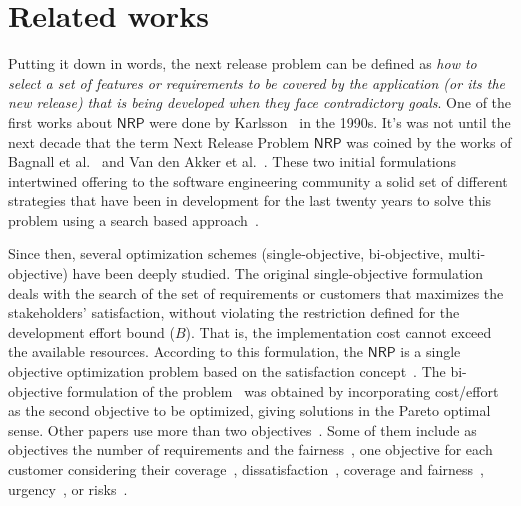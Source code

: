 \section{Related works}
\label{sec:related-work}

Putting it down in words, the next release problem can be defined as \emph{how to select a set of features or requirements to be covered by the application (or its the new release) that is being developed when they face contradictory goals}. One of the first works about \ensuremath{\mathsf{NRP}} were done by Karlsson~\cite{karlsson1996} in the 1990s. It's was not until the next decade that the term Next Release Problem \ensuremath{\mathsf{NRP}} was coined by the works of Bagnall et al.~\cite{bagnall2001} and Van den Akker et al.~\cite{van2005}. These two initial formulations intertwined offering to the software engineering community a solid set of different strategies that have been in development for the last twenty years to solve this problem  using a search based approach~\cite{pitangueira2015,hujainah2018}.

Since then,  several optimization schemes (single-objective, bi-objective, multi-objective) have been deeply studied. The original single-objective formulation~\cite{bagnall2001,van2005} deals with the search of the set of requirements or customers that maximizes the stakeholders' satisfaction, without violating the restriction defined for the development effort bound ($B$). That is, the implementation cost cannot exceed the available resources. According to this formulation, the \ensuremath{\mathsf{NRP}} is a single objective optimization problem based on the satisfaction concept~\cite{jung1998}. The bi-objective formulation of the problem~\cite{zhang2007} was obtained by incorporating cost/effort as the second objective to be optimized, giving solutions in the Pareto optimal sense. Other papers use more than two objectives~\cite{ramirez2019}. Some of them include as objectives the number of requirements and the fairness~\cite{finkelstein2009}, one objective for each customer considering their coverage~\cite{zhang2011}, dissatisfaction~\cite{nayebi2018, sangwan2020}, coverage and fairness~\cite{geng2018}, urgency~\cite{agarwal2014}, or risks~\cite{pitangueira2017}.

